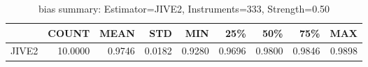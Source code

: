 \begin{table}[ht]
\centering
\caption{bias summary: Estimator=JIVE2, Instruments=333, Strength=0.50}
\begin{tabular}{lrrrrrrrr}
\toprule
 & COUNT & MEAN & STD & MIN & 25\% & 50\% & 75\% & MAX \\
\midrule
JIVE2 & 10.0000 & 0.9746 & 0.0182 & 0.9280 & 0.9696 & 0.9800 & 0.9846 & 0.9898 \\
\bottomrule
\end{tabular}
\end{table}
